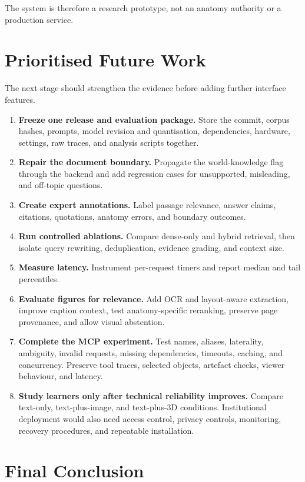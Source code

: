 The system is therefore a research prototype, not an anatomy authority or a production service.

\section{Prioritised Future Work}
\label{sec:conclusion-future-work}

The next stage should strengthen the evidence before adding further interface features.

\begin{enumerate}
  \item \textbf{Freeze one release and evaluation package.} Store the commit, corpus hashes, prompts, model revision and quantisation, dependencies, hardware, settings, raw traces, and analysis scripts together.
  \item \textbf{Repair the document boundary.} Propagate the world-knowledge flag through the backend and add regression cases for unsupported, misleading, and off-topic questions.
  \item \textbf{Create expert annotations.} Label passage relevance, answer claims, citations, quotations, anatomy errors, and boundary outcomes.
  \item \textbf{Run controlled ablations.} Compare dense-only and hybrid retrieval, then isolate query rewriting, deduplication, evidence grading, and context size.
  \item \textbf{Measure latency.} Instrument per-request timers and report median and tail percentiles.
  \item \textbf{Evaluate figures for relevance.} Add OCR and layout-aware extraction, improve caption context, test anatomy-specific reranking, preserve page provenance, and allow visual abstention.
  \item \textbf{Complete the MCP experiment.} Test names, aliases, laterality, ambiguity, invalid requests, missing dependencies, timeouts, caching, and concurrency. Preserve tool traces, selected objects, artefact checks, viewer behaviour, and latency.
  \item \textbf{Study learners only after technical reliability improves.} Compare text-only, text-plus-image, and text-plus-3D conditions. Institutional deployment would also need access control, privacy controls, monitoring, recovery procedures, and repeatable installation.
\end{enumerate}

\section{Final Conclusion}
\label{sec:conclusion-final}

